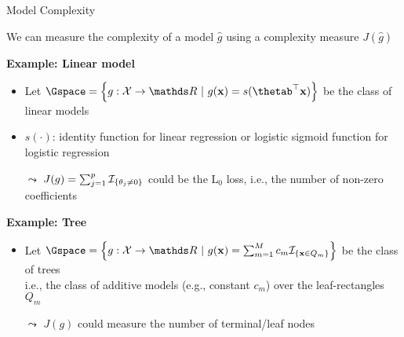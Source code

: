\documentclass[10pt,compress,t,notes=noshow, xcolor=table]{beamer}
\newcommand{\gh}{\hat{g}}
\begin{document}
\begin{frame}{Model Complexity}
    
    We can measure the complexity of a model $\gh$ using a complexity measure $J(\gh)$ \lz

 	\textbf{Example: Linear model}\\
 	\begin{itemize}
 	    \item Let $\Gspace = \left\{g: \Xspace \to \R ~|~g(\xv) = s(\thetab^\top \xv)\right\}$ be the class of linear models
 	    \item $s(\cdot)$: identity function for linear regression or logistic sigmoid function for logistic regression
 	    \item[$\leadsto$] $J(g) = \sum_{j = 1}^p \mathcal{I}_{\{ \theta_j \neq 0 \}}$ could be the L$_0$ loss, i.e., the number of non-zero coefficients 
 	\end{itemize}
 	\lz\pause
 	
 	\textbf{Example: Tree}\\
 	\begin{itemize}
 	    \item Let $\Gspace = \left\{g:\Xspace \to \R ~|~g(\xv) = \sum_{m=1}^M c_m \ind_{\{ \xv \in Q_m \}}\right\}$ be the class of trees\\
 	     i.e., the class of additive models (e.g., constant $c_m$)  over the leaf-rectangles $Q_m$
 	    \item[$\leadsto$] $J(g)$ could measure the number of terminal/leaf nodes
 	\end{itemize}
 	
\end{frame}
 
\end{document}
